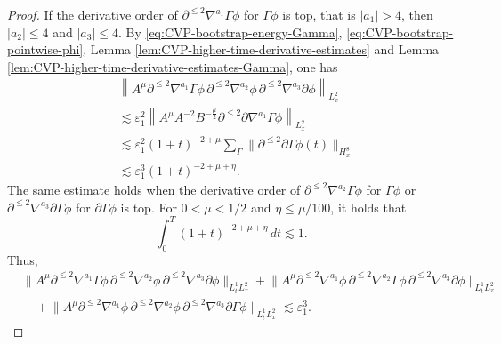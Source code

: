 \documentclass[11pt,twoside]{article}
\def\p{\partial}
\def\ve{\varepsilon}
\def\ls{\lesssim}
\theoremstyle{plain}
\theoremstyle{definition}
\theoremstyle{assumption}
\numberwithin{equation}{section}
\begin{document}
\begin{proof}
		
		If the derivative order of  $\p^{\le2}\nabla^{a_1}\Gamma\phi$ for $\Gamma\phi$ is top, that is $|a_1|>4$, then $|a_2|\le 4$ and $|a_3| \le 4$.
		By  \eqref{eq:CVP-bootstrap-energy-Gamma}, \eqref{eq:CVP-bootstrap-pointwise-phi},
Lemma \ref{lem:CVP-higher-time-derivative-estimates}
		and Lemma \ref{lem:CVP-higher-time-derivative-estimates-Gamma}, one has
		\begin{equation}
			\label{eq:CVP-Gamma-R3-high-Gamma-Strichartz}
			\begin{aligned}
				&
				\left\|
				A^{\mu}
				\p^{\le2}\nabla^{a_1}\Gamma\phi\,
				\p^{\le2}\nabla^{a_2}\phi\,
				\p^{\le2}\nabla^{a_3}\p\phi
				\right\|_{L^2_x}
				\\
				&\ls
				\ve_1^2
				\left\|
				A^{\mu}A^{-2}B^{-\frac{\mu}{2}}
				\p^{\le2}\p\nabla^{a_1}\Gamma\phi
				\right\|_{L^2_x}
				\\
				&\ls
				\ve_1^2
				(1+t)^{-2+\mu}
				\sum_{\Gamma}
				\|\p^{\le2}\p\Gamma\phi(t)\|_{H^{8}_x}
				\\
				&\ls
				\ve_1^3
				(1+t)^{-2+\mu+\eta}.
			\end{aligned}
		\end{equation}
The same estimate holds when the derivative order of \(\p^{\le2}\nabla^{a_2}\Gamma\phi\) for $\Gamma\phi$ or
		\(\p^{\le2}\nabla^{a_3}\p\Gamma\phi\) for $\p\Gamma\phi$  is top. For \(0<\mu<1/2\) and \(\eta\le\mu/100\), it holds that
		\[
		\int_0^T
		(1+t)^{-2+\mu+\eta}\,dt
		\ls 1.
		\]
		Thus,
\begin{equation}\label{YHC-27}
\begin{aligned}
&
				\big\|
				A^{\mu}
				\p^{\le2}\nabla^{a_1}\Gamma\phi\,
				\p^{\le2}\nabla^{a_2}\phi\,
				\p^{\le2}\nabla^{a_3}\p\phi
				\big\|_{L_t^1L^2_x}
+\big\|A^{\mu}\p^{\le2}\nabla^{a_1}\phi\,
\p^{\le2}\nabla^{a_2}\Gamma\phi\,
\p^{\le2}\nabla^{a_3}\p\phi\big\|_{L_t^1L^2_x}\\
&\quad +\big\|A^{\mu}\p^{\le2}\nabla^{a_1}\phi\,
				\p^{\le2}\nabla^{a_2}\phi\,
			\p^{\le2}\nabla^{a_3}\p\Gamma\phi\|_{L_t^1L^2_x}
			\ls\ve_1^3.
\end{aligned}
		\end{equation}


\end{proof}
\end{document}
